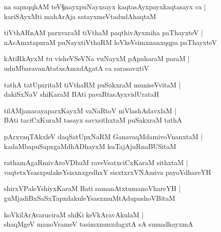 \begin{shloka}
na sapxqqhAM teV\S nayxpuNayxsayx kaqtasAyxpayxkaqtasayx ca |\\
kariSAyxMti mahArAja satayxmeVtadudAhaqtaM 
\end{shloka}

\begin{shloka}
tiVthARnAM parxvaraM tiVthaM paqthivAyxmiha paThayxteV |\\
nAsAmxtapxraM puNayxtiVthaRM loVkeVsimxnanxqqpa paThayxteV 
\end{shloka}

\begin{shloka}
kAtiRkAyxM tu visheVSeVNa vuNayxM pApaharaM paraM |\\
uduMbaravanAtatxsAmxdAgatA ca sarasavxtiV
\end{shloka}

\begin{shloka}
tathA tatUpxritaM tiVthaRM puSakxraM muniseVvitaM |\\
dakiSxNaV shiKaraM BAti pavaRtasAyxvidUrataH 
\end{shloka}

\begin{shloka}
tilAMjanacayaparxKayxM vaNaRtoV niVlashAdavxlaM |\\
BAti taciCxKuraM tasayx savxsithxtaM puSakxraM tathA
\end{shloka}

\begin{shloka}
pArxvaqTAkxleV daqSatUpxNaRM GanavaqMdamivoVnanxtaM |\\
kadaMbapuSapxgaMdhADhayxM kuTajAjuRnaBUSitaM
\end{shloka}

\begin{shloka}
rathamAgaRmivAroVDhuM raveVsatxciCxKaraM sithxtaM |\\
vaqtetxYsasxpulakeYsisxnxgedhxY sisxtxrxVNAmiva payoVdhareYH 
\end{shloka}

\begin{shloka}
shirxVPaleYshiyxKaraM Bati samanAtxtumanoVhareYH |\\
guMjadiBxSaSxTapxdakuleYsasxmuMtAdupashoVBitaM
\end{shloka}

\begin{shloka}
koVkilArAvaruciraM shiKi keVkAravAkulaM |\\
shaqMgeV manoVrameV tasimxnunxdagxtA sA sumadhayxmA
\end{shloka}

